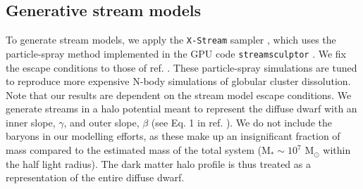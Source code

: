 \documentclass[pdflatex,sn-mathphys-num]{sn-jnl}
\theoremstyle{thmstyleone}
\theoremstyle{thmstyletwo}
\theoremstyle{thmstylethree}
\begin{document}
\subsection{Generative stream models}
To generate stream models, we apply the \texttt{X-Stream} sampler \citep{NibPear2025}, which uses the particle-spray method \citep{fardal2015} implemented in the GPU code \texttt{streamsculptor} \citep{nibauer2025}.
We fix the escape conditions to those of ref. \citep{fardal2015}. These particle-spray simulations are tuned to reproduce more expensive N-body simulations of globular cluster dissolution. Note that our results are dependent on the stream model escape conditions.
We generate streams in a halo potential meant to represent the diffuse dwarf with an inner slope, $\gamma$, and outer slope, $\beta$ (see Eq. 1 in ref. \citep[][]{NibPear2025}). We do not include the baryons in our modelling efforts, as these make up an insignificant fraction of mass compared to the estimated mass of the total system (M$_* \sim 10^7$ M$_{\odot}$ within the half light radius)\citep{Fielder2023}. The dark matter halo profile is thus treated as a representation of the entire diffuse dwarf.
\end{document}
